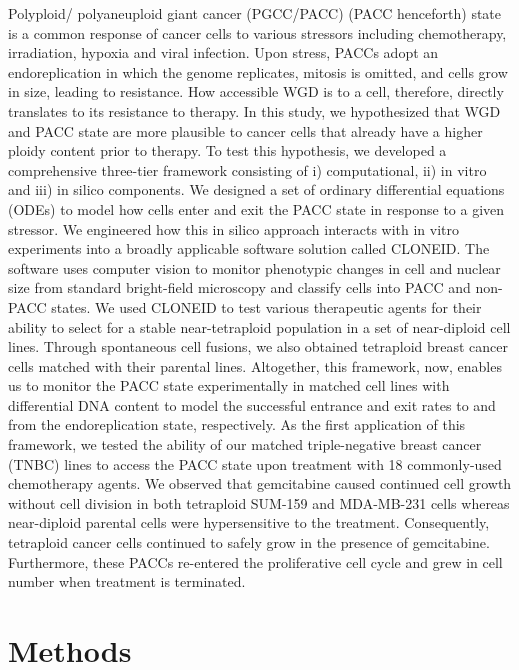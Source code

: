 \documentclass[11pt,notitlepage]{article}
\begin{document}
Polyploid/ polyaneuploid giant cancer (PGCC/PACC) (PACC henceforth) state is a common response of cancer cells to various stressors including chemotherapy, irradiation, hypoxia and viral infection. Upon stress, PACCs adopt an endoreplication in which the genome replicates, mitosis is omitted, and cells grow in size, leading to resistance. How accessible WGD is to a cell, therefore, directly translates to its resistance to therapy. In this study, we hypothesized that WGD and PACC state are more plausible to cancer cells that already have a higher ploidy content prior to therapy. To test this hypothesis, we developed a comprehensive three-tier framework consisting of i) computational, ii) in vitro and iii) in silico components.
We designed a set of ordinary differential equations (ODEs) to model how cells enter and exit the PACC state in response to a given stressor. We engineered how this in silico approach interacts with in vitro experiments into a broadly applicable software solution called CLONEID. The software uses computer vision to monitor phenotypic changes in cell and nuclear size from standard bright-field microscopy and classify cells into PACC and non-PACC states. We used CLONEID to test various therapeutic agents for their ability to select for a stable near-tetraploid population in a set of near-diploid cell lines. Through spontaneous cell fusions, we also obtained tetraploid breast cancer cells matched with their parental lines. Altogether, this framework, now, enables us to monitor the PACC state experimentally in matched cell lines with differential DNA content to model the successful entrance and exit rates to and from the endoreplication state, respectively.
As the first application of this framework, we tested the ability of our matched triple-negative breast cancer (TNBC) lines to access the PACC state upon treatment with 18 commonly-used chemotherapy agents. We observed that gemcitabine caused continued cell growth without cell division in both tetraploid SUM-159 and MDA-MB-231 cells whereas near-diploid parental cells were hypersensitive to the treatment. Consequently, tetraploid cancer cells continued to safely grow in the presence of gemcitabine. Furthermore, these PACCs re-entered the proliferative cell cycle and grew in cell number when treatment is terminated.
\clearpage
\section*{Methods}
\end{document}

